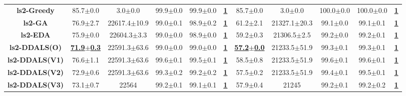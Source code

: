 \documentclass[lettersize,journal]{IEEEtran}
\begin{document}
\begin{table}[!t]
{\begin{tabular}{ccccccccccc}
        \midrule
        {\bfseries ls2-Greedy} &85.7$\pm$0.0&3.0$\pm$0.0 & 99.9$\pm$0.0&99.9$\pm$0.0 &\underline{\bfseries 1} &85.7$\pm$0.0&3.0$\pm$0.0& 100.0$\pm$0.0&100.0$\pm$0.0  &\underline{\bfseries 1} \\
        {\bfseries ls2-GA} &76.9$\pm$2.7&22617.4$\pm$10.9 & 99.0$\pm$0.1&98.9$\pm$0.2 &\underline{\bfseries 1} &61.2$\pm$2.1&21327.1$\pm$20.3& 99.1$\pm$0.0&99.1$\pm$0.1  &\underline{\bfseries 1} \\
        {\bfseries ls2-EDA} &75.9$\pm$0.0&22604.3$\pm$3.3 & 99.0$\pm$0.0&98.9$\pm$0.0 &\underline{\bfseries 1} &59.2$\pm$0.3&21306.5$\pm$2.5& 99.2$\pm$0.0&99.2$\pm$0.1  &\underline{\bfseries 1} \\
        {\bfseries ls2-DDALS(O)} &\underline{\bfseries 71.9$\pm$0.3} &22591.3$\pm$63.6 & 99.0$\pm$0.0&99.0$\pm$0.0 &\underline{\bfseries 1} &\underline{\bfseries 57.2$\pm$0.0} &21233.5$\pm$51.9& 99.3$\pm$0.1&99.3$\pm$0.1  &\underline{\bfseries 1} \\
        {\bfseries ls2-DDALS(V1)} &76.6$\pm$1.1&22591.3$\pm$63.6 & 99.6$\pm$0.1&99.5$\pm$0.1 &\underline{\bfseries 1} &58.5$\pm$0.8&21233.5$\pm$51.9& 99.6$\pm$0.1&99.6$\pm$0.1  &\underline{\bfseries 1} \\
        {\bfseries ls2-DDALS(V2)} &72.9$\pm$0.6&22591.3$\pm$63.6 & 99.3$\pm$0.2&99.2$\pm$0.2 &\underline{\bfseries 1} &57.5$\pm$0.2&21233.5$\pm$51.9& 99.4$\pm$0.1&99.5$\pm$0.1  &\underline{\bfseries 1} \\
        {\bfseries ls2-DDALS(V3)} &73.1$\pm$0.7&22564 & 99.2$\pm$0.1&99.1$\pm$0.1 &\underline{\bfseries 1} &57.9$\pm$0.4&21245& 99.2$\pm$0.1&99.2$\pm$0.2  &\underline{\bfseries 1} \\
        

\end{tabular}}
\end{table}
\end{document}
